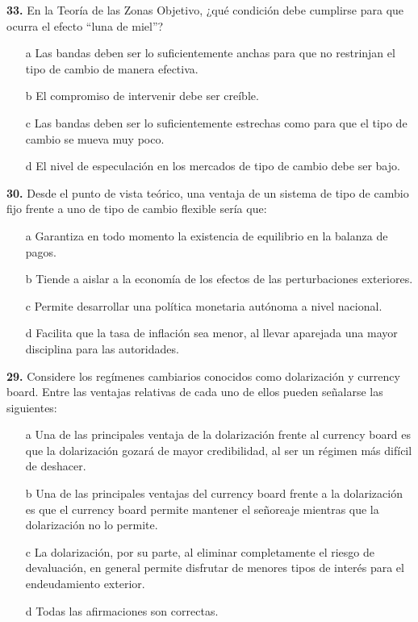 \documentclass{nuevotema}
\begin{document}
\textbf{33.} En la Teoría de las Zonas Objetivo, ¿qué condición debe cumplirse para que ocurra el efecto ``luna de miel''?

\begin{itemize}
	\item[a] Las bandas deben ser lo suficientemente anchas para que no restrinjan el tipo de cambio de manera efectiva.
	\item[b] El compromiso de intervenir debe ser creíble. 
	\item[c] Las bandas deben ser lo suficientemente estrechas como para que el tipo de cambio se mueva muy poco.
	\item[d] El nivel de especulación en los mercados de tipo de cambio debe ser bajo.
\end{itemize}

\textbf{30.} Desde el punto de vista teórico, una ventaja de un sistema de tipo de cambio fijo frente a uno de tipo de cambio flexible sería que:

\begin{itemize}
	\item[a] Garantiza en todo momento la existencia de equilibrio en la balanza de pagos.
	\item[b] Tiende a aislar a la economía de los efectos de las perturbaciones exteriores.
	\item[c] Permite desarrollar una política monetaria autónoma a nivel nacional.
	\item[d] Facilita que la tasa de inflación sea menor, al llevar aparejada una mayor disciplina para las autoridades.
\end{itemize}

\textbf{29.} Considere los regímenes cambiarios conocidos como dolarización y currency board. Entre las ventajas relativas de cada uno de ellos pueden señalarse las siguientes:

\begin{itemize}
	\item[a] Una de las principales ventaja de la dolarización frente al currency board es que la dolarización gozará de mayor credibilidad, al ser un régimen más difícil de deshacer.
	\item[b] Una de las principales ventajas del currency board frente a la dolarización es que el currency board permite mantener el señoreaje mientras que la dolarización no lo permite.
	\item[c] La dolarización, por su parte, al eliminar completamente el riesgo de devaluación, en general permite disfrutar de menores tipos de interés para el endeudamiento exterior.
	\item[d] Todas las afirmaciones son correctas.
\end{itemize}
\end{document}
